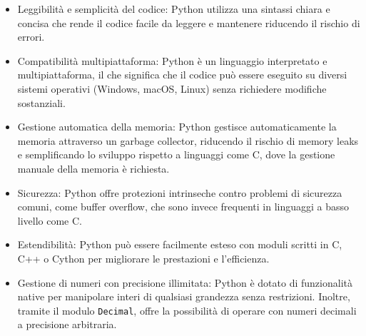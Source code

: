 \begin{itemize}
    \item Leggibilità e semplicità del codice: Python utilizza una sintassi 
    chiara e concisa che rende il codice facile da leggere e mantenere riducendo 
    il rischio di errori.
    \item Compatibilità multipiattaforma: Python è un linguaggio interpretato e 
    multipiattaforma, il che significa che il codice può essere eseguito su diversi 
    sistemi operativi (Windows, macOS, Linux) senza richiedere modifiche sostanziali.
    \item Gestione automatica della memoria: Python gestisce automaticamente la memoria 
    attraverso un garbage collector, riducendo il rischio di memory leaks e semplificando 
    lo sviluppo rispetto a linguaggi come C, dove la gestione manuale della memoria è richiesta.
    \item Sicurezza: Python offre protezioni intrinseche contro problemi di sicurezza 
    comuni, come buffer overflow, che sono invece frequenti in linguaggi a basso livello come C.
    \item Estendibilità: Python può essere facilmente esteso con moduli 
    scritti in C, C++ o Cython per migliorare le prestazioni e l'efficienza. 
    \item Gestione di numeri con precisione illimitata: Python è dotato di funzionalità 
    native per manipolare interi di qualsiasi grandezza senza restrizioni. Inoltre, 
    tramite il modulo \texttt{Decimal}, offre la possibilità di operare con numeri 
    decimali a precisione arbitraria. 
\end{itemize}

